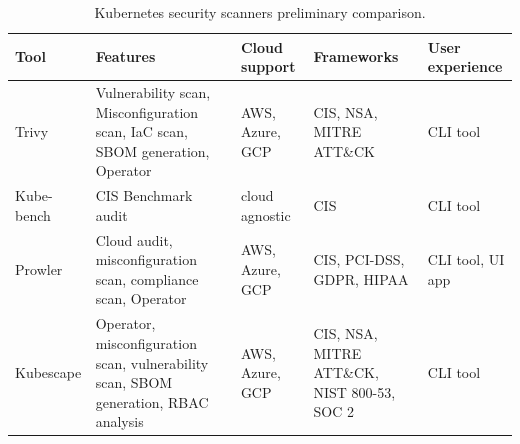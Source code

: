 \begin{table}[H]
    \begin{center}
        \begin{tabular}{
            | >{\raggedright\arraybackslash}p{} 
            | >{\raggedright\arraybackslash}p{} 
            | >{\raggedright\arraybackslash}p{} 
            | >{\raggedright\arraybackslash}p{} 
            | >{\raggedright\arraybackslash}p{} | }
        \hline
        \textbf{Tool} & \textbf{Features} & \textbf{Cloud support} & \textbf{Frameworks} & \textbf{User experience} \\
        \hline\hline
        Trivy & Vulnerability scan, Misconfiguration scan, IaC scan, SBOM generation, Operator & AWS, Azure, GCP & CIS, NSA, MITRE ATT\&CK & CLI tool \\
        \hline
        Kube-bench & CIS Benchmark audit & cloud agnostic & CIS & CLI tool \\
        \hline
        Prowler & Cloud audit, misconfiguration scan, compliance scan, Operator & AWS, Azure, GCP & CIS, PCI-DSS, GDPR, HIPAA & CLI tool, UI app \\
        \hline
        Kubescape & Operator, misconfiguration scan, vulnerability scan, SBOM generation, RBAC analysis & AWS, Azure, GCP & CIS, NSA, MITRE ATT\&CK, NIST 800-53, SOC 2 & CLI tool \\
        \hline
        \end{tabular}
    \end{center}
    \caption{Kubernetes security scanners preliminary comparison.}
    \label{tab:preliminary-scanner-comparison}
\end{table}
